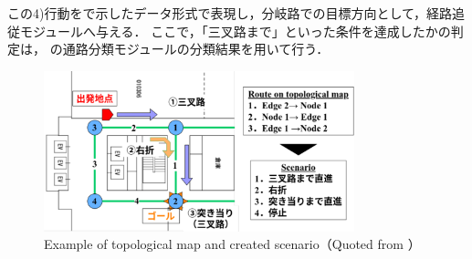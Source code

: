 この4)行動をで示したデータ形式で表現し，分岐路での目標方向として，経路追従モジュールへ与える．
ここで，「三叉路まで」といった条件を達成したかの判定は，
の通路分類モジュールの分類結果を用いて行う．
\vspace{3zh}
\begin{figure}[htbp]
    \centering
     \includegraphics[width=90mm]{images/pdf/topo2sce.pdf}
     \caption[Example of topological map and created scenario]{Example of topological map and created scenario（Quoted from \cite{haruyama2023}）}
     \label{fig:topo2sce}
\end{figure}